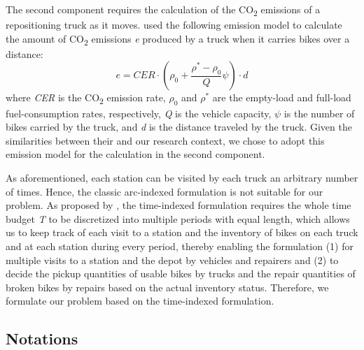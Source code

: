 The second component requires the calculation of the CO\textsubscript{2} emissions of a
repositioning truck as it moves. \citet{wangEnhancedArtificialBee2021} used the following emission model to
calculate the amount of CO\textsubscript{2} emissions \emph{e} produced by a truck when it carries
bikes over a
distance:\begin{equation}
\label{ch4:eq:1}
e = CER \cdot \left( {\rho_{0} + \frac{\rho^{\ast} - \rho_{0}}{Q}\psi} \right) \cdot d
\end{equation}where
\emph{CER} is the CO\textsubscript{2} emission rate, \(\rho_{0}\) and \(\rho^{\ast}\) are the
empty-load and full-load fuel-consumption rates, respectively, \emph{Q} is the vehicle
capacity, \(\psi\) is the number of bikes carried by the truck, and \emph{d} is the distance
traveled by the truck. Given the similarities between their and our research context, we chose to
adopt this emission model for the calculation in the second component.

As aforementioned, each station can be visited by each truck an arbitrary number of times. Hence,
the classic arc-indexed formulation is not suitable for our problem. As proposed by
\citet{ravivStaticRepositioningBikesharing2013}, the time-indexed formulation requires the whole time budget \emph{T} to be discretized into
multiple periods with equal length, which allows us to keep track of each visit to a station and the
inventory of bikes on each truck and at each station during every period, thereby enabling the
formulation (1) for multiple visits to a station and the depot by vehicles and repairers and (2) to
decide the pickup quantities of usable bikes by trucks and the repair quantities of broken bikes by
repairs based on the actual inventory status. Therefore, we formulate our problem based on the
time-indexed formulation.

\subsection{Notations}\label{ch4:subsec:notations}

